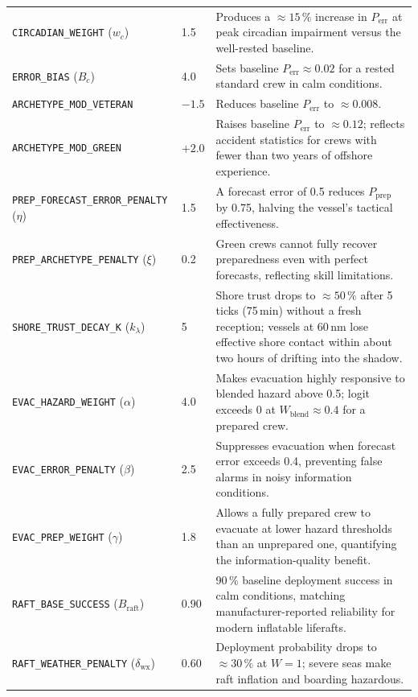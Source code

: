 \documentclass[cameraready]{Interspeech}
\begin{document}
\begin{table}[htbp]
\begin{tabularx}{16cm}{@{}llX@{}}
        \texttt{CIRCADIAN\_WEIGHT} ($w_c$) & 1.5 & Produces a $\approx 15\,\%$ increase in $P_\text{err}$ at peak circadian impairment versus the well-rested baseline. \\
        \texttt{ERROR\_BIAS} ($B_c$) & 4.0 & Sets baseline $P_\text{err} \approx 0.02$ for a rested standard crew in calm conditions. \\
        \texttt{ARCHETYPE\_MOD\_VETERAN} & $-1.5$ & Reduces baseline $P_\text{err}$ to $\approx 0.008$. \\
        \texttt{ARCHETYPE\_MOD\_GREEN} & $+2.0$ & Raises baseline $P_\text{err}$ to $\approx 0.12$; reflects accident statistics for crews with fewer than two years of offshore experience. \\
        \texttt{PREP\_FORECAST\_ERROR\_PENALTY} ($\eta$) & 1.5 & A forecast error of 0.5 reduces $P_\text{prep}$ by 0.75, halving the vessel's tactical effectiveness. \\
        \texttt{PREP\_ARCHETYPE\_PENALTY} ($\xi$) & 0.2 & Green crews cannot fully recover preparedness even with perfect forecasts, reflecting skill limitations. \\
        \texttt{SHORE\_TRUST\_DECAY\_K} ($k_\lambda$) & 5 & Shore trust drops to $\approx 50\,\%$ after 5 ticks (75\,min) without a fresh reception; vessels at 60\,nm lose effective shore contact within about two hours of drifting into the shadow. \\
        \texttt{EVAC\_HAZARD\_WEIGHT} ($\alpha$) & 4.0 & Makes evacuation highly responsive to blended hazard above 0.5; logit exceeds 0 at $W_\text{blend} \approx 0.4$ for a prepared crew. \\
        \texttt{EVAC\_ERROR\_PENALTY} ($\beta$) & 2.5 & Suppresses evacuation when forecast error exceeds 0.4, preventing false alarms in noisy information conditions. \\
        \texttt{EVAC\_PREP\_WEIGHT} ($\gamma$) & 1.8 & Allows a fully prepared crew to evacuate at lower hazard thresholds than an unprepared one, quantifying the information-quality benefit. \\
        \texttt{RAFT\_BASE\_SUCCESS} ($B_\text{raft}$) & 0.90 & 90\,\% baseline deployment success in calm conditions, matching manufacturer-reported reliability for modern inflatable liferafts. \\
        \texttt{RAFT\_WEATHER\_PENALTY} ($\delta_\text{wx}$) & 0.60 & Deployment probability drops to $\approx 30\,\%$ at $W{=}1$; severe seas make raft inflation and boarding hazardous. \\

\end{tabularx}
\end{table}
\end{document}
